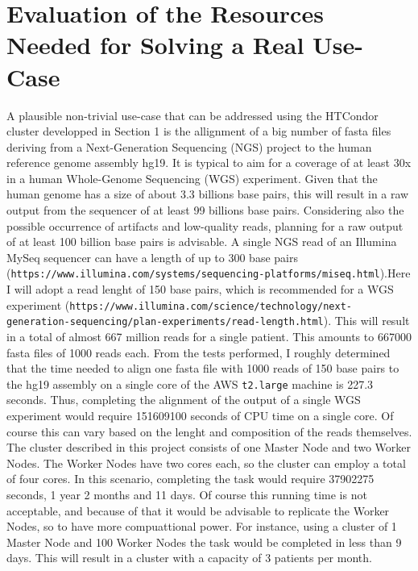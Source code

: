 \documentclass{article}
\begin{document}
\section{Evaluation of the Resources Needed for Solving a Real Use-Case}
A plausible non-trivial use-case that can be addressed using the HTCondor cluster developped in Section 1 is the allignment of a big number of fasta files deriving from a Next-Generation Sequencing (NGS) project to the human reference genome assembly hg19.
It is typical to aim for a coverage of at least 30x in a human Whole-Genome Sequencing (WGS) experiment.
Given that the human genome has a size of about 3.3 billions base pairs, this will result in a raw output from the sequencer of at least 99 billions base pairs.
Considering also the possible occurrence of artifacts and low-quality reads, planning for a raw output of at least 100 billion base pairs is advisable.
A single NGS read of an Illumina MySeq sequencer can have a length of up to 300 base pairs (\texttt{https://www.illumina.com/systems/sequencing-platforms/miseq.html}).Here I will adopt a read lenght of 150 base pairs, which is recommended for a WGS experiment (\texttt{https://www.illumina.com/science/technology/next-generation-sequencing/plan-experiments/read-length.html}).
This will result in a total of almost 667 million reads for a single patient.
This amounts to 667000 fasta files of 1000 reads each.
From the tests performed, I roughly determined that the time needed to align one fasta file with 1000 reads of 150 base pairs to the hg19 assembly on a single core of the AWS \texttt{t2.large} machine is 227.3 seconds.
Thus, completing the alignment of the output of a single WGS experiment would require 151609100 seconds of CPU time on a single core.
Of course this can vary based on the lenght and composition of the reads themselves.
The cluster described in this project consists of one Master Node and two Worker Nodes.
The Worker Nodes have two cores each, so the cluster can employ a total of four cores.
In this scenario, completing the task would require 37902275 seconds, 1 year 2 months and 11 days.
Of course this running time is not acceptable, and because of that it would be advisable to replicate the Worker Nodes, so to have more compuattional power.
For instance, using a cluster of 1 Master Node and 100 Worker Nodes the task would be completed in less than 9 days.
This will result in a cluster with a capacity of 3 patients per month.
\end{document}
